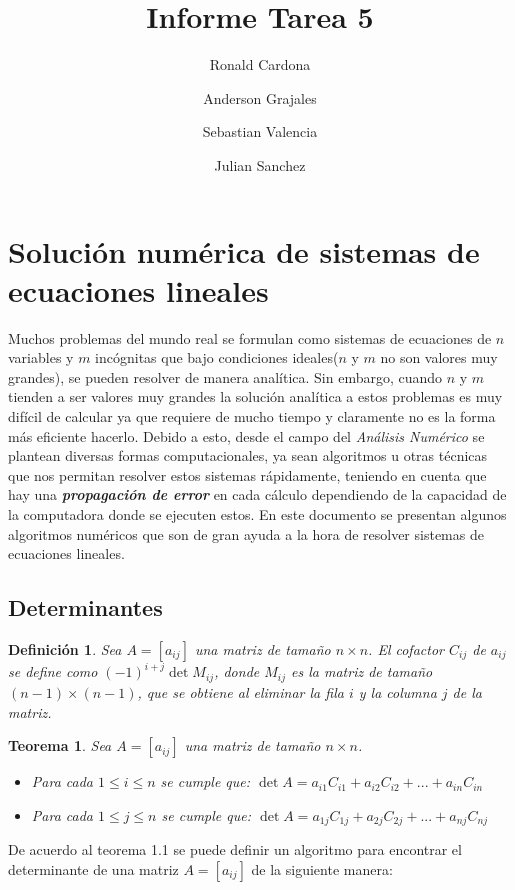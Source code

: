 \documentclass[12pt]{article}
\title{Informe Tarea 5}
\author {Ronald Cardona
\and Anderson Grajales
\and Sebastian Valencia
\and Julian Sanchez}
\newtheorem{definition}{Definición}[section]
\newtheorem{theorem}{Teorema}[section]
\begin{document}
	\maketitle
	\section{Solución numérica de sistemas de ecuaciones lineales}
	Muchos problemas del mundo real se formulan como sistemas de ecuaciones de $n$ variables y $m$ incógnitas que bajo condiciones ideales($n$ y $m$ no son valores muy grandes), se pueden resolver de manera analítica. Sin embargo, cuando $n$ y $m$ tienden a ser valores muy grandes la solución analítica a estos problemas es muy difícil de calcular ya que requiere de mucho tiempo y claramente no es la forma más eficiente hacerlo. Debido a esto, desde el campo del \textit{Análisis Numérico} se plantean diversas formas computacionales, ya sean algoritmos u otras técnicas que nos permitan resolver estos sistemas rápidamente, teniendo en cuenta que hay una \textit{\textbf{propagación de error}} en cada cálculo dependiendo de la capacidad de la computadora donde se ejecuten estos.
	En este documento se presentan algunos algoritmos numéricos que son de gran ayuda a la hora de resolver sistemas de ecuaciones lineales.
	\subsection{Determinantes}
	\begin{definition}
		Sea $A = [a_{ij}]$ una matriz de tamaño $n \times n$. El cofactor $C_{ij}$ de $a_{ij}$ se define como $(-1)^{i+j}\det {M_{ij}}$, donde $M_{ij}$ es la matriz de tamaño $(n - 1) \times (n - 1)$, que se obtiene al eliminar la fila $i$ y la columna $j$ de la matriz.\cite{algebralineal}
	\end{definition}
	\begin{theorem}
		Sea $A=[a_{ij}]$ una matriz de tamaño $n \times n$. \cite{algebralineal}
		\begin{itemize}
			\item Para cada $1\leq i \leq n$ se cumple que:
			$\det {A} = a_{i1}C_{i1} + a_{i2}C_{i2} + ... + a_{in}C_{in}$
			\item Para cada $1\leq j \leq n$ se cumple que:
			$\det {A} = a_{1j}C_{1j} + a_{2j}C_{2j} + ... + a_{nj}C_{nj}$
		\end{itemize}
	\end{theorem}
	De acuerdo al teorema 1.1 se puede definir un algoritmo para encontrar el determinante de una matriz $A = [a_{ij}]$ de la siguiente manera:
	
\end{document}
